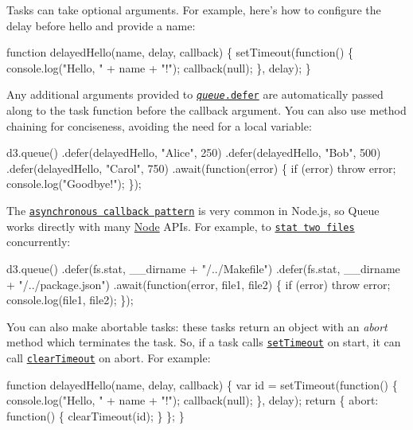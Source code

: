 Tasks can take optional arguments. For example, here’s how to configure the delay before hello and provide a name\+:


\begin{DoxyCode}
function delayedHello(name, delay, callback) \{
  setTimeout(function() \{
    console.log("Hello, " + name + "!");
    callback(null);
  \}, delay);
\}
\end{DoxyCode}


Any additional arguments provided to \href{#queue_defer}{\tt {\itshape queue}.defer} are automatically passed along to the task function before the callback argument. You can also use method chaining for conciseness, avoiding the need for a local variable\+:


\begin{DoxyCode}
d3.queue()
    .defer(delayedHello, "Alice", 250)
    .defer(delayedHello, "Bob", 500)
    .defer(delayedHello, "Carol", 750)
    .await(function(error) \{
      if (error) throw error;
      console.log("Goodbye!");
    \});
\end{DoxyCode}


The \href{https://github.com/maxogden/art-of-node#callbacks}{\tt asynchronous callback pattern} is very common in Node.\+js, so Queue works directly with many \mbox{\hyperlink{classNode}{Node}} A\+P\+Is. For example, to \href{https://nodejs.org/dist/latest/docs/api/fs.html#fs_fs_stat_path_callback}{\tt stat two files} concurrently\+:


\begin{DoxyCode}
d3.queue()
    .defer(fs.stat, \_\_dirname + "/../Makefile")
    .defer(fs.stat, \_\_dirname + "/../package.json")
    .await(function(error, file1, file2) \{
      if (error) throw error;
      console.log(file1, file2);
    \});
\end{DoxyCode}


You can also make abortable tasks\+: these tasks return an object with an {\itshape abort} method which terminates the task. So, if a task calls \href{https://developer.mozilla.org/en-US/docs/Web/API/WindowTimers/setTimeout}{\tt set\+Timeout} on start, it can call \href{https://developer.mozilla.org/en-US/docs/Web/API/WindowTimers/clearTimeout}{\tt clear\+Timeout} on abort. For example\+:


\begin{DoxyCode}
function delayedHello(name, delay, callback) \{
  var id = setTimeout(function() \{
    console.log("Hello, " + name + "!");
    callback(null);
  \}, delay);
  return \{
    abort: function() \{
      clearTimeout(id);
    \}
  \};
\}
\end{DoxyCode}


